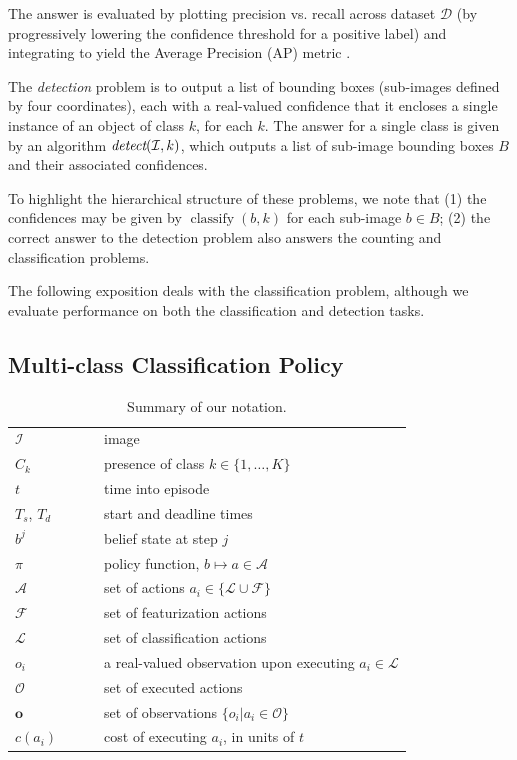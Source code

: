 \documentclass[runningheads]{llncs}
\begin{document}
The answer is evaluated by plotting precision vs. recall across dataset $\mathcal{D}$ (by progressively lowering the confidence threshold for a positive label) and integrating to yield the Average Precision (AP) metric \cite{pascal-voc-2010}.


The \emph{detection} problem is to output a list of bounding boxes (sub-images defined by four coordinates), each with a real-valued confidence that it encloses a single instance of an object of class $k$, for each $k$.
The answer for a single class is given by an algorithm $\emph{detect}(\mathcal{I},k)$, which outputs a list of sub-image bounding boxes $B$ and their associated confidences.

To highlight the hierarchical structure of these problems, we note that (1) the confidences may be given by $\operatorname{classify}(b,k)$ for each sub-image $b \in B$; (2) the correct answer to the detection problem also answers the counting and classification problems.

The following exposition deals with the classification problem, although we evaluate performance on both the classification and detection tasks.

\subsection{Multi-class Classification Policy}

\begin{table}
\centering
\caption{Summary of our notation.}
\label{tab:notation}
\begin{tabular}{|l|l|}
	\hline
	$\mathcal{I}$	&	image \\
	$C_k$         & presence of class $k \in \{1,\dots,K\}$ \\ 
	$t$           & time into episode \\ 
	$T_s$, $T_d$  & start and deadline times \\ 
	$b^j$        	& belief state at step $j$ \\ 
	$\pi$         & policy function, $b \mapsto a \in \mathcal{A}$ \\
	$\mathcal{A}$ & set of actions $a_i \in \{\mathcal{L} \cup \mathcal{F}\}$\\ 
	$\mathcal{F}$ & set of featurization actions \\
	$\mathcal{L}$ & set of classification actions\\
	$o_i$					&	a real-valued observation upon executing $a_i \in \mathcal{L}$\\
	$\mathcal{O}$	& set of executed actions\\
	$\mathbf{o}$	& set of observations $\{o_i | a_i \in \mathcal{O}\}$\\
	$c(a_i)$				& cost of executing $a_i$, in units of $t$\\
	\hline
\end{tabular}\end{table}
\end{document}
